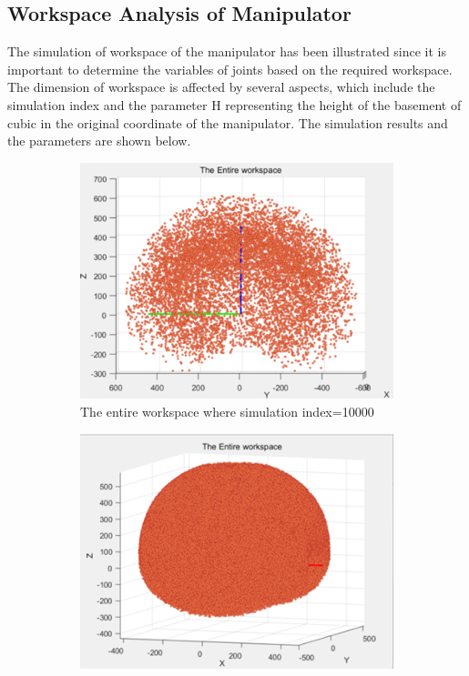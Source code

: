 \subsection{Workspace Analysis of Manipulator}
The simulation of workspace of the manipulator has been illustrated since it is important to determine the 
variables of joints based on the required workspace. The dimension of workspace is affected by several aspects, 
which include the simulation index and the parameter H representing the height of the basement of cubic in the 
original coordinate of the manipulator. The simulation results and the parameters are shown below.
\begin{figure}[H] %
    \centering %
    \captionsetup{labelsep=colon}
    \begin{subfigure}{0.45\textwidth} %
        \centering
        \includegraphics[width=\linewidth]{Image/Result/workspace_10000.png}
        \caption{\centering The entire workspace where simulation index=10000}
        \label{fig:ws_10000}
    \end{subfigure}
    \hfill
    \begin{subfigure}{0.45\textwidth} %
        \centering
        \includegraphics[width=\linewidth]{Image/Result/workspace_1000000.png}

\end{subfigure}
\end{figure}
